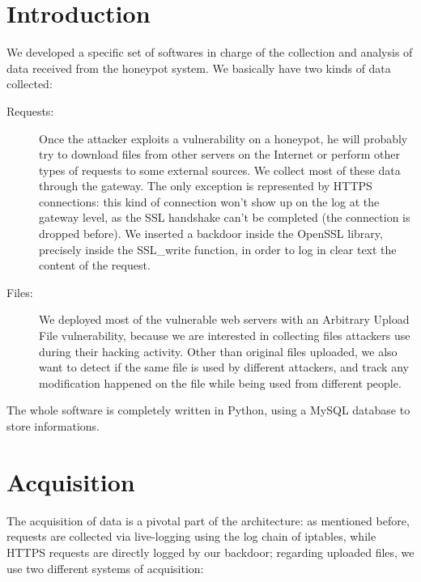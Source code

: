\section{Introduction}

We developed a specific set of softwares in charge of the collection and analysis of data received from the honeypot system.
We basically have two kinds of data collected:
\begin{description}
\item[Requests: ] Once the attacker exploits a vulnerability on a honeypot, he will probably try to download files from other servers on the Internet or perform other types of requests to some external sources. We collect most of these data through the gateway. The only exception is represented by HTTPS connections: this kind of connection won't show up on the log at the gateway level, as the SSL handshake can't be completed (the connection is dropped before). We inserted a backdoor inside the OpenSSL library, precisely inside the SSL\_write function, in order to log in clear text the content of the request.

\item[Files: ] We deployed most of the vulnerable web servers with an Arbitrary Upload File vulnerability, because we are interested in collecting files attackers use during their hacking activity. Other than original files uploaded, we also want to detect if the same file is used by different attackers, and track any modification happened on the file while being used from different people.
\end{description}

The whole software is completely written in Python, using a MySQL database to store informations.

\section{Acquisition}

The acquisition of data is a pivotal part of the architecture: as mentioned before, requests are collected via live-logging using the log chain of iptables, while HTTPS requests are directly logged by our backdoor; regarding uploaded files, we use two different systems of acquisition:


